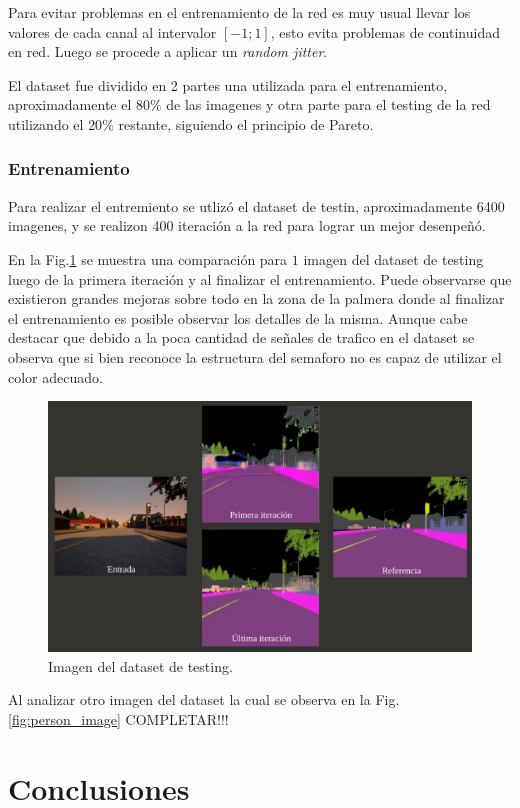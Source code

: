 \documentclass[]{IEEEtran}
\begin{document}
    Para evitar problemas en el entrenamiento de la red es muy usual llevar los valores de cada canal al 
    intervalor $[-1;1]$, esto evita problemas de continuidad en red. Luego 
    se procede a aplicar un \textit{random jitter}.

    El dataset fue dividido en 2 partes una utilizada para el entrenamiento, aproximadamente el $80 \% $ de las imagenes y 
    otra parte para el testing de la red utilizando el $20 \%$ restante, siguiendo el principio de Pareto.

    \subsubsection{Entrenamiento}

    Para realizar el entremiento se utlizó el dataset de testin, aproximadamente 6400 imagenes, 
    y se realizon 400 iteración a la red para lograr un mejor desenpeñó. 
    
    En la Fig.\ref{fig:resultados}
    se muestra una comparación para $1$ imagen del dataset de testing luego de la primera iteración 
    y al finalizar el entrenamiento.
    Puede observarse que existieron grandes mejoras sobre todo en la zona de la palmera
    donde al finalizar el entrenamiento es posible observar los detalles de la misma.
    Aunque cabe destacar que debido a la poca cantidad de señales de trafico en el dataset
    se observa que si bien reconoce la estructura del semaforo no es capaz de utilizar el color 
    adecuado.

    \begin{figure}[htb]
        \centering
        \includegraphics[width=.4\textwidth]{Imgs/grapics_results.jpg}    
        \caption{Imagen del dataset de testing.}
        \label{fig:resultados}
    \end{figure}

    Al analizar otro imagen del dataset la cual se observa en la Fig.\ref{fig:person_image}
    \huge{COMPLETAR!!!}


    \section{Conclusiones}

    
    
\end{document}
